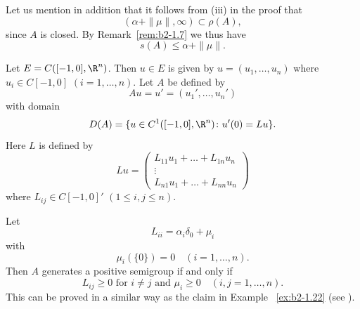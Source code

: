 Let us mention in addition that it follows from \upshape(iii) in the proof that 
%
\[
	(\alpha + \|\mu\|, \infty) \subset \rho(A) ,
\]
%
since $A$ is closed.
By Remark~\ref{rem:b2-1.7} we thus have
\begin{equation}\label{eq:b2-1.14}
s(A) \leq \alpha + \|\mu\|.
\end{equation}
\begin{example}\label{ex:b2-1.23}
Let $E = C([-1,0],\R^{n})$.
Then $u \in E$ is given by $u = (u_{1},\ldots,u_{n})$ where $u_{i} \in C[-1,0]$ $(i=1,\ldots,n)$.
Let $A$ be defined by 
%
\[
	Au = u' = (u_{1}',\ldots,u_{n}')
\]
% 
with domain 
%
\[
	D(A) = \{u \in C^{1}([-1,0],\R^{n}) \colon u'(0) = Lu\} .
\]
%
Here $L$ is defined by
\[
    Lu = \begin{pmatrix}
        L_{11}u_{1} + \ldots + L_{1n}u_{n} \\
        \vdots \\
        L_{n1}u_{1} + \ldots + L_{nn}u_{n}
    \end{pmatrix}
\]
where $L_{ij} \in C[-1,0]'$ $(1 \leq i,j \leq n)$.

Let 
%
\[
	 L_{ii} = \alpha_{i}\delta_{0} + \mu_{i}
\]
%
with
%
\[
	 \mu_{i}(\{0\}) = 0 \quad (i = 1, \ldots, n) .
\]
%
Then $A$ generates a positive semigroup if and only if 
\[
L_{ij} \geq 0 \text{ for } i \neq j \text{ and } \mu_{i} \geq 0 \quad (i,j = 1,\ldots,n) .
\]
This can be proved in a similar way as the claim in Example ~\ref{ex:b2-1.22} 
(see \textcite{arendt:1984a}).
\end{example}

